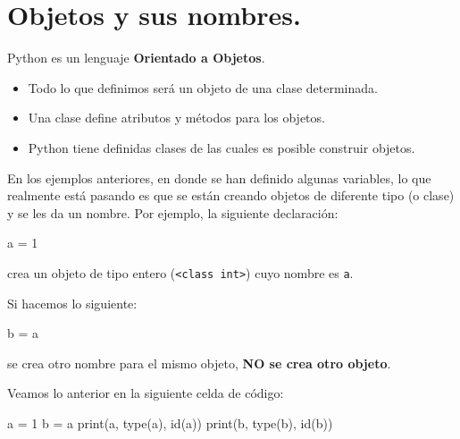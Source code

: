 \documentclass[
  spanish,
  letterpaper,
]{scrbook}
\newenvironment{Shaded}{\begin{snugshade}}{\end{snugshade}}
\newcommand{\BuiltInTok}[1]{\textcolor[rgb]{0.00,0.23,0.31}{#1}}
\newcommand{\DecValTok}[1]{\textcolor[rgb]{0.68,0.00,0.00}{#1}}
\newcommand{\NormalTok}[1]{\textcolor[rgb]{0.00,0.23,0.31}{#1}}
\newcommand{\OperatorTok}[1]{\textcolor[rgb]{0.37,0.37,0.37}{#1}}
\providecommand{\tightlist}{%
  \setlength{\itemsep}{0pt}\setlength{\parskip}{0pt}}
\theoremstyle{definition}
\theoremstyle{remark}
\begin{document}
\section{Objetos y sus nombres.}\label{sec-a-objetos-nombres}

Python es un lenguaje \textbf{Orientado a Objetos}.

\begin{itemize}
\tightlist
\item
  Todo lo que definimos será un objeto de una clase determinada.
\item
  Una clase define atributos y métodos para los objetos.
\item
  Python tiene definidas clases de las cuales es posible construir
  objetos.
\end{itemize}

En los ejemplos anteriores, en donde se han definido algunas variables,
lo que realmente está pasando es que se están creando objetos de
diferente tipo (o clase) y se les da un nombre. Por ejemplo, la
siguiente declaración:

\begin{Shaded}
\begin{Highlighting}[]
\NormalTok{a }\OperatorTok{=} \DecValTok{1}
\end{Highlighting}
\end{Shaded}

crea un objeto de tipo entero
(\texttt{\textless{}class\ \textquotesingle{}int\textquotesingle{}\textgreater{}})
cuyo nombre es \texttt{a}.

Si hacemos lo siguiente:

\begin{Shaded}
\begin{Highlighting}[]
\NormalTok{b }\OperatorTok{=}\NormalTok{ a}
\end{Highlighting}
\end{Shaded}

se crea otro nombre para el mismo objeto, \textbf{NO se crea otro
objeto}.

Veamos lo anterior en la siguiente celda de código:

\begin{Shaded}
\begin{Highlighting}[]
\NormalTok{a }\OperatorTok{=} \DecValTok{1}
\NormalTok{b }\OperatorTok{=}\NormalTok{ a}
\BuiltInTok{print}\NormalTok{(a, }\BuiltInTok{type}\NormalTok{(a), }\BuiltInTok{id}\NormalTok{(a))}
\BuiltInTok{print}\NormalTok{(b, }\BuiltInTok{type}\NormalTok{(b), }\BuiltInTok{id}\NormalTok{(b))}
\end{Highlighting}
\end{Shaded}
\end{document}

